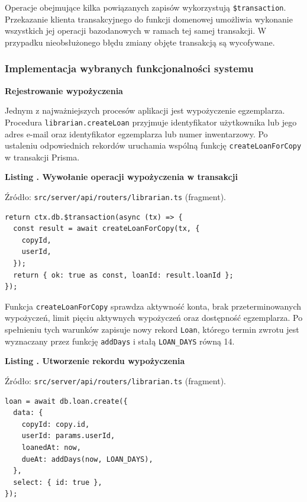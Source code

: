 \documentclass[11pt, a4paper]{article}
\begin{document}
Operacje obejmujące kilka powiązanych zapisów wykorzystują \texttt{\$transaction}. Przekazanie klienta transakcyjnego do funkcji domenowej umożliwia wykonanie wszystkich jej operacji bazodanowych w ramach tej samej transakcji. W przypadku nieobsłużonego błędu zmiany objęte transakcją są wycofywane.


\subsubsection{Implementacja wybranych funkcjonalności systemu}
\label{subsec:implementacja-funkcji}

\noindent\textbf{Rejestrowanie wypożyczenia}

Jednym z najważniejszych procesów aplikacji jest wypożyczenie egzemplarza. Procedura \texttt{librarian.createLoan} przyjmuje identyfikator użytkownika lub jego adres e-mail oraz identyfikator egzemplarza lub numer inwentarzowy. Po ustaleniu odpowiednich rekordów uruchamia wspólną funkcję \texttt{createLoanForCopy} w transakcji Prisma.

\noindent\textbf{Listing \thebdcode. Wywołanie operacji wypożyczenia w transakcji}
\label{lst:loan-tx}
\par\nopagebreak
{\footnotesize
\noindent Źródło: \texttt{src/server/api/routers/librarian.ts} (fragment).
\par\nopagebreak
\begin{verbatim}
return ctx.db.$transaction(async (tx) => {
  const result = await createLoanForCopy(tx, {
    copyId,
    userId,
  });
  return { ok: true as const, loanId: result.loanId };
});
\end{verbatim}
}

Funkcja \texttt{createLoanForCopy} sprawdza aktywność konta, brak przeterminowanych wypożyczeń, limit pięciu aktywnych wypożyczeń oraz dostępność egzemplarza. Po spełnieniu tych warunków zapisuje nowy rekord \texttt{Loan}, którego termin zwrotu jest wyznaczany przez funkcję \texttt{addDays} i stałą \texttt{LOAN\_DAYS} równą 14.

\noindent\textbf{Listing \thebdcode. Utworzenie rekordu wypożyczenia}
\label{lst:loan-create}
\par\nopagebreak
{\footnotesize
\noindent Źródło: \texttt{src/server/api/routers/librarian.ts} (fragment).
\par\nopagebreak
\begin{verbatim}
loan = await db.loan.create({
  data: {
    copyId: copy.id,
    userId: params.userId,
    loanedAt: now,
    dueAt: addDays(now, LOAN_DAYS),
  },
  select: { id: true },
});
\end{verbatim}
}
\end{document}
